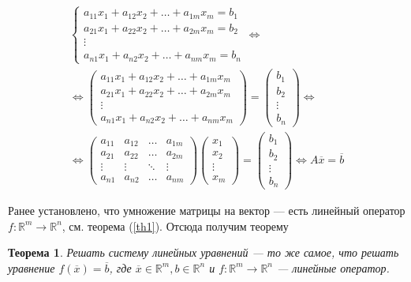 \documentclass[]{article}
\theoremstyle{theorem}
\newtheorem{thr}{Теорема}
\theoremstyle{definition}
\begin{document}
\begin{gather*}
	\begin{cases}
		a_{11}x_1 + a_{12}x_2 + \ldots + a_{1m}x_m=b_1
		\\
		a_{21}x_1 + a_{22}x_2 + \ldots + a_{2m}x_m=b_2
		\\
		\vdots
		\\
		a_{n1}x_1 + a_{n2}x_2 + \ldots + a_{nm}x_m=b_n
	\end{cases}
	\Leftrightarrow
	\\
	\Leftrightarrow
	\begin{pmatrix}
	a_{11}x_1 + a_{12}x_2 + \ldots + a_{1m}x_m
	\\
	a_{21}x_1 + a_{22}x_2 + \ldots + a_{2m}x_m
	\\
	\vdots
	\\
	a_{n1}x_1 + a_{n2}x_2 + \ldots + a_{nm}x_m
\end{pmatrix}
=
	\begin{pmatrix}
	b_1
	\\
	b_2
	\\
	\vdots
	\\
	b_n
\end{pmatrix}
\Leftrightarrow
\\
\Leftrightarrow
	\begin{pmatrix}
	a_{11} & a_{12} & \ldots & a_{1m}
	\\
	a_{21} & a_{22} & \ldots & a_{2m}
	\\
	\vdots & \vdots & \ddots & \vdots
	\\
	a_{n1} & a_{n2} & \ldots & a_{nm}
\end{pmatrix}
\begin{pmatrix}
	x_{1}
	\\
	x_{2}
	\\
	\vdots
	\\
	x_{m}
\end{pmatrix}
=
\begin{pmatrix}
	b_1
	\\
	b_2
	\\
	\vdots
	\\
	b_n
\end{pmatrix}
\Leftrightarrow
A\overline{x}=\overline{b}
\end{gather*}

Ранее установлено, что умножение матрицы на вектор --- есть линейный оператор $f:\mathbb{R}^m\rightarrow\mathbb{R}^n$, см. теорема (\ref{th1}). Отсюда получим теорему

\begin{thr}
Решать систему линейных уравнений --- то же самое, что решать уравнение $f(\overline{x})=\overline{b}$, где $\overline{x}\in \mathbb{R}^m,b\in\mathbb{R}^n$ и $f:\mathbb{R}^m\rightarrow\mathbb{R}^n$ --- линейные оператор.
\end{thr}
\end{document}
